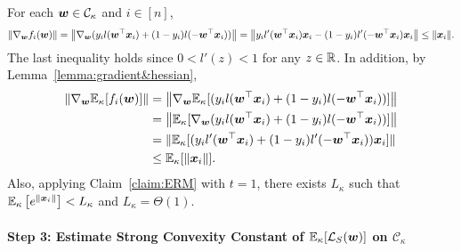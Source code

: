 For each ${\bm{w}} \in \mathcal{C}_\kappa$ and $i \in [n]$, 
\begin{equation*}
\lVert \nabla_{\bm{w}} f_i({\bm{w}}) \rVert = \left \lVert \nabla_{\bm{w}} (y_il({\bm{w}}^\top {\bm{x}}_i) + (1-y_i) l(-{\bm{w}}^\top {\bm{x}}_i)) \right \rVert 
= \left \lVert y_il'({\bm{w}}^\top {\bm{x}}_i){\bm{x}}_i - (1-y_i) l'(-{\bm{w}}^\top {\bm{x}}_i){\bm{x}}_i \right \rVert 
\leq  \lVert {\bm{x}}_i \rVert.
\end{equation*}
The last inequality holds since $0<l'(z) <1$ for any $z\in \mathbb{R}$. In addition, by Lemma~\ref{lemma:gradient&hessian},
\begin{align*}
\left\lVert \nabla_{\bm{w}} \mathbb{E}_\kappa [f_i({\bm{w}})]\right \rVert &=  \left \lVert \nabla_{\bm{w}} \mathbb{E}_\kappa [(y_il({\bm{w}}^\top {\bm{x}}_i) + (1-y_i) l(-{\bm{w}}^\top {\bm{x}}_i)) ]\right \rVert\\
&= \left \lVert  \mathbb{E}_\kappa [\nabla_{\bm{w}}(y_il({\bm{w}}^\top {\bm{x}}_i) + (1-y_i) l(-{\bm{w}}^\top {\bm{x}}_i)) ]\right \rVert\\
&= \lVert \mathbb{E}_\kappa [(y_il'({\bm{w}}^\top {\bm{x}}_i) + (1-y_i) l'(-{\bm{w}}^\top {\bm{x}}_i)){\bm{x}}_i ]\rVert\\
&\leq \mathbb{E}_\kappa [\lVert {\bm{x}}_i \rVert].
\end{align*}
Also, applying Claim~\ref{claim:ERM} with $t = 1$, there exists $L_\kappa$ such that $\mathbb{E}_\kappa \left[ e^{\lVert {\bm{x}}_i \rVert}\right]< L_\kappa$ and $L_\kappa = \Theta(1)$.


\paragraph{Step 3: Estimate Strong Convexity Constant of $\mathbb{E}_\kappa[\mathcal{L}_S ({\bm{w}})]$ on $\mathcal{C}_\kappa$} \quad

